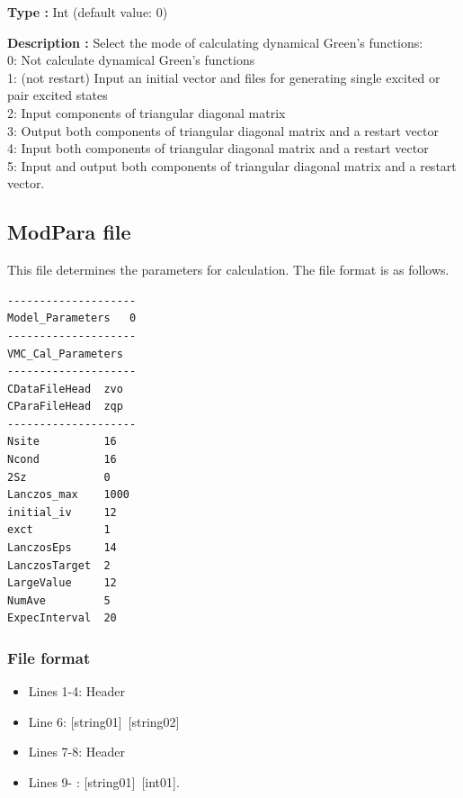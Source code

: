 \begin{itemize}
{\bf Type :} {Int (default value: 0)}

{\bf Description :} {Select the mode of calculating dynamical Green's functions:\\
0: Not calculate  dynamical Green's functions\\
1: (not restart) Input an initial vector and files for generating single excited or pair excited states\\
2: Input components of triangular diagonal matrix\\
3: Output both components of triangular diagonal matrix and a restart vector\\
4: Input both components of triangular diagonal matrix and a restart vector\\
5: Input and output  both components of triangular diagonal matrix and a restart vector.\\
}

\end{itemize}

\newpage
\subsection{ModPara file}
\label{Subsec:modpara}
This file determines the parameters for calculation. The file format is as follows.\\
\begin{minipage}{10cm}
\begin{screen}
\begin{verbatim}
--------------------
Model_Parameters   0
--------------------
VMC_Cal_Parameters
--------------------
CDataFileHead  zvo
CParaFileHead  zqp
--------------------
Nsite          16   
Ncond          16    
2Sz            0 
Lanczos_max    1000 
initial_iv     12   
exct           1    
LanczosEps     14   
LanczosTarget  2    
LargeValue     12   
NumAve         5    
ExpecInterval  20   
\end{verbatim}
\end{screen}
\end{minipage}

\subsubsection{File format}
 \begin{itemize}
   \item  Lines 1-4:  Header
   \item  Line 6:  [string01]~[string02]
   \item  Lines 7-8:  Header
   \item  Lines 9- : [string01]~[int01].
  \end{itemize}
